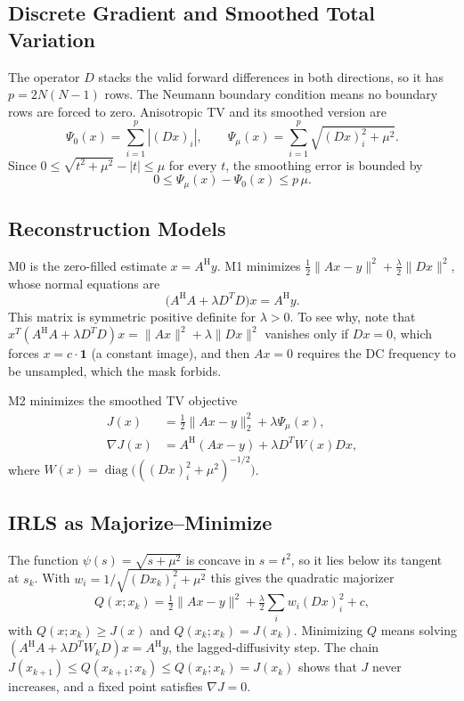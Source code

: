 \documentclass[conference,a4paper]{IEEEtran}
\newcommand{\AH}{A^{\mathrm{H}}}
\begin{document}
\subsection{Discrete Gradient and Smoothed Total Variation}
The operator $D$ stacks the valid forward differences in both directions, so it has $p=2N(N-1)$ rows. The Neumann boundary condition means no boundary rows are forced to zero. Anisotropic TV and its smoothed version are
\begin{equation}
\Psi_0(x)=\sum_{i=1}^{p}|(Dx)_i|,\qquad
\Psi_\mu(x)=\sum_{i=1}^{p}\sqrt{(Dx)_i^2+\mu^2}.
\end{equation}
Since $0\le\sqrt{t^2+\mu^2}-|t|\le\mu$ for every $t$, the smoothing error is bounded by
\begin{equation}
0\le\Psi_\mu(x)-\Psi_0(x)\le p\,\mu .
\end{equation}

\subsection{Reconstruction Models}
M0 is the zero-filled estimate $x=\AH y$. M1 minimizes $\tfrac12\|Ax-y\|^2+\tfrac{\lambda}{2}\|Dx\|^2$, whose normal equations are
\begin{equation}
\big(\AH A+\lambda D^{T}D\big)x=\AH y .
\end{equation}
This matrix is symmetric positive definite for $\lambda>0$. To see why, note that $x^{T}(\AH A+\lambda D^{T}D)x=\|Ax\|^2+\lambda\|Dx\|^2$ vanishes only if $Dx=0$, which forces $x=c\cdot\mathbf{1}$ (a constant image), and then $Ax=0$ requires the DC frequency to be unsampled, which the mask forbids.

M2 minimizes the smoothed TV objective
\begin{equation}
\begin{aligned}
J(x)&=\tfrac12\|Ax-y\|_2^2+\lambda\Psi_\mu(x),\\
\nabla J(x)&=\AH(Ax-y)+\lambda D^{T}W(x)Dx,
\end{aligned}
\end{equation}
where $W(x)=\operatorname{diag}\!\big(((Dx)_i^2+\mu^2)^{-1/2}\big)$.

\subsection{IRLS as Majorize--Minimize}\label{sec:irls}
The function $\psi(s)=\sqrt{s+\mu^2}$ is concave in $s=t^2$, so it lies below its tangent at $s_k$. With $w_i=1/\sqrt{(Dx_k)_i^2+\mu^2}$ this gives the quadratic majorizer
\begin{equation}
Q(x;x_k)=\tfrac12\|Ax-y\|^2+\tfrac{\lambda}{2}\sum_i w_i(Dx)_i^2+c,
\end{equation}
with $Q(x;x_k)\ge J(x)$ and $Q(x_k;x_k)=J(x_k)$. Minimizing $Q$ means solving $(\AH A+\lambda D^{T}W_kD)x=\AH y$, the lagged-diffusivity step. The chain $J(x_{k+1})\le Q(x_{k+1};x_k)\le Q(x_k;x_k)=J(x_k)$ shows that $J$ never increases, and a fixed point satisfies $\nabla J=0$.
\end{document}
